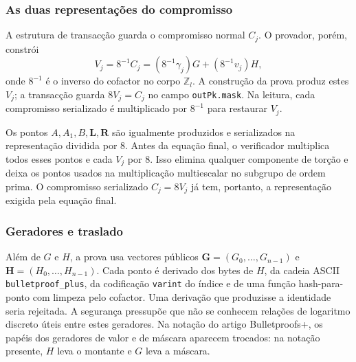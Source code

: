 \subsubsection*{As duas representações do compromisso}

%
A estrutura de transacção guarda o compromisso normal \(C_j\). O provador,
porém, constrói
\begin{equation}
 V_j=8^{-1}C_j=(8^{-1}\gamma_j)G+(8^{-1}v_j)H,
 \label{eq:bpp-v-eighth}
\end{equation}
onde \(8^{-1}\) é o inverso do cofactor no corpo \(\mathbb Z_l\). A construção
da prova produz estes \(V_j\); a transacção guarda \(8V_j=C_j\) no campo
\texttt{outPk.mask}. Na leitura, cada compromisso serializado é multiplicado
por \(8^{-1}\) para restaurar \(V_j\).

Os pontos \(A,A_1,B,\boldsymbol L,\boldsymbol R\) são igualmente produzidos e
serializados na representação dividida por 8. Antes da equação final, o
verificador multiplica todos esses pontos e cada \(V_j\) por 8. Isso elimina
qualquer componente de torção e deixa os pontos usados na multiplicação
multiescalar no subgrupo de ordem prima. O compromisso serializado
\(C_j=8V_j\) já tem, portanto, a representação exigida pela equação final.


\subsubsection*{Geradores e traslado}

Além de \(G\) e \(H\), a prova usa vectores públicos
\(\boldsymbol G=(G_0,\ldots,G_{n-1})\) e
\(\boldsymbol H=(H_0,\ldots,H_{n-1})\). Cada ponto é derivado dos
bytes de \(H\), da cadeia ASCII \texttt{bulletproof\_plus}, da codificação
\texttt{varint} do índice e de uma função hash-para-ponto com limpeza pelo
cofactor. Uma derivação que produzisse a identidade seria rejeitada. A
segurança pressupõe que não se conhecem relações de logaritmo discreto úteis
entre estes geradores. Na notação do artigo Bulletproofs+, os papéis dos
geradores de valor e de máscara aparecem trocados: na notação presente, \(H\)
leva o montante e \(G\) leva a máscara.

